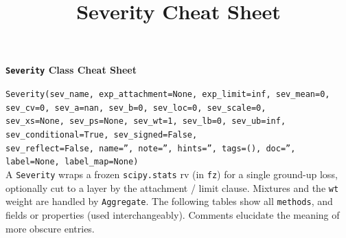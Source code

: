 %
%
%


\title{Severity Cheat Sheet}




{\huge{\textbf{\texttt{Severity} Class Cheat Sheet}}}

\raggedright
\texttt{\m Severity(sev\_name, exp\_attachment=None, exp\_limit=inf, sev\_mean=0, sev\_cv=0, sev\_a=nan, sev\_b=0, sev\_loc=0, sev\_scale=0,} \\
\texttt{\phantom{\m Severity(}sev\_xs=None, sev\_ps=None, sev\_wt=1, sev\_lb=0, sev\_ub=inf, sev\_conditional=True, sev\_signed=False,} \\
\texttt{\phantom{\m Severity(}sev\_reflect=False, name='', note='', hints='', tags=(), doc='', label=None, label\_map=None)} \\

A \texttt{Severity} wraps a frozen \texttt{scipy.stats} rv (in \texttt{fz}) for a single ground-up loss, optionally cut to a layer by the attachment / limit clause. Mixtures and the \texttt{wt} weight are handled by \texttt{Aggregate}.
The following tables show all \texttt{\m methods}, and fields or properties (used interchangeably). Comments elucidate the meaning of more obscure entries.


